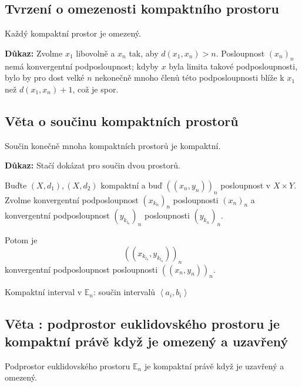 \documentclass[../main.tex]{subfiles}
\begin{document}
\subsection{Tvrzení o omezenosti kompaktního prostoru}
\hspace{1.2mm}
\noindent
Každý kompaktní prostor je omezený.

\vspace{5mm}
\noindent
\textbf{Důkaz:} Zvolme $x_1$ libovolně a $x_n$ tak, aby $d(x_1,x_n) > n$. Posloupnost $(x_n)_n$ nemá konvergentní podposloupnost; kdyby $x$
byla limita takové podposloupnosti, bylo by pro dost velké $n$ nekonečně mnoho členů této podposloupnosti blíže k $x_1$ než $d(x_1,x_n)+1$, což je spor.

\subsection{Věta o součinu kompaktních prostorů}
\hspace{1.2mm}
\noindent
Součin konečně mnoha kompaktních prostorů je kompaktní.

\vspace{5mm}
\noindent
\textbf{Důkaz:} Stačí dokázat pro součin dvou prostorů.

Buďte $(X,d_1), (X, d_2)$ kompaktní a buď $((x_n,y_n))_n$ posloupnost v $X \times Y$. 
Zvolme konvergentní podposloupnost $(x_{k_n})_n$ posloupnosti $(x_n)_n$ a konvergentní podposloupnost $(y_{k_{l_n}})_n$ posloupnosti $(y_{k_n})_n$.

Potom je 
\[((x_{k_{l_n}},y_{k_{l_n}}))_n\]
konvergentní podposloupnost posloupnosti $((x_n,y_n))_n$.

\begin{center}
    Kompaktní interval v $\mathbb{E}_n$: součin intervalů $\left<a_i,b_i\right>$
\end{center}

\newpage
\subsection{Věta : podprostor euklidovského prostoru je kompaktní právě když je omezený a uzavřený}
\hspace{1.2mm}
\noindent
Podprostor euklidovského prostoru $\mathbb{E}_n$ je kompaktní právě když je uzavřený a omezený.
\end{document}
